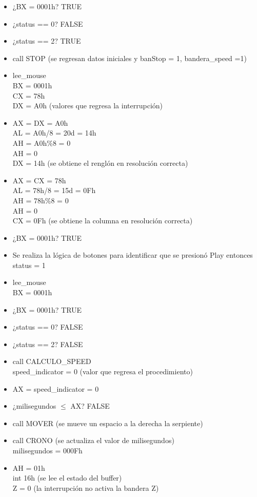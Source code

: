 \documentclass[12pt]{article}
\begin{document}
\begin{enumerate}
\begin{itemize}
        \item ¿BX = 0001h? TRUE
        \item ¿status == 0? FALSE
        \item ¿status == 2? TRUE
        \item call STOP (se regresan datos iniciales y banStop = 1, bandera\_speed =1)
        \item lee\_mouse \\ BX = 0001h\\ CX = 78h \\ DX = A0h (valores que regresa la interrupción)
        \item AX = DX = A0h \\ AL = A0h/8 = 20d = 14h \\ AH = A0h\%8 = 0 \\ AH = 0 \\DX = 14h (se obtiene el renglón en resolución correcta)
        \item AX = CX = 78h \\ AL = 78h/8 = 15d = 0Fh \\ AH = 78h\%8 = 0 \\ AH = 0 \\CX = 0Fh (se obtiene la columna en resolución correcta)
        \item ¿BX = 0001h? TRUE
        \item Se realiza la lógica de botones para identificar que se presionó Play entonces status = 1
        \item lee\_mouse \\ BX = 0001h
        \item ¿BX = 0001h? TRUE
        \item ¿status == 0? FALSE
        \item ¿status == 2? FALSE
        \item call CALCULO\_SPEED \\ speed\_indicator = 0 (valor que regresa el procedimiento)
        \item AX = speed\_indicator = 0
        \item ¿milisegundos $\leq$ AX? FALSE
        \item call MOVER (se mueve un espacio a la derecha la serpiente)
        \item call CRONO (se actualiza el valor de milisegundos) \\ milisegundos = 000Fh
        \item AH = 01h \\ int 16h (se lee el estado del buffer) \\ Z = 0 (la interrupción no activa la bandera Z)

\end{itemize}
\end{enumerate}
\end{document}
